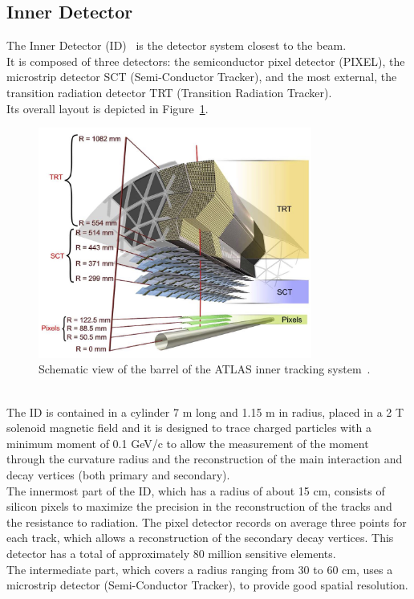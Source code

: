 \subsection{Inner Detector}
\label{sec:ID}
The Inner Detector (ID)~\cite{ATLAS} is the detector system closest to the beam.\\
It is composed of three detectors: the semiconductor pixel detector (PIXEL), the microstrip detector SCT (Semi-Conductor Tracker), and the most external, the transition radiation detector TRT (Transition Radiation 
Tracker).\\
Its overall layout is depicted in Figure~\ref{fig:ID}.
\begin{figure}[h]
	\centering
	\includegraphics[width=9cm]{Chapters/CH2/figures/ID}
	\caption{Schematic view of the barrel of the ATLAS inner tracking system~\cite{ATLAS}.}
	\label{fig:ID}
\end{figure}
\\The ID is contained in a cylinder 7 m long and 1.15 m in radius, placed in a 2 T solenoid magnetic field and it is designed to trace charged particles with a minimum moment of 0.1 GeV/c to allow the measurement of the moment through the curvature radius and the reconstruction of the main interaction and decay vertices (both primary and secondary).\\
The innermost part of the ID, which has a radius of about 15 cm, consists of silicon pixels to maximize the precision in the reconstruction of the tracks and the resistance to radiation.
The pixel detector records on average three points for each track, which allows a reconstruction of the secondary decay vertices. This detector has a total of approximately 80 million sensitive elements.
\vspace{\baselineskip}
\\The intermediate part, which covers a radius ranging from 30 to 60 cm, uses a microstrip detector (Semi-Conductor Tracker), to provide good spatial resolution.
